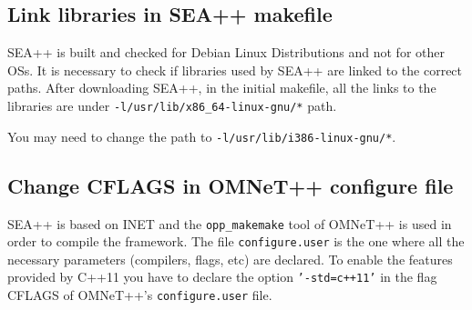 \subsection{Link libraries in SEA++ makefile}
SEA++ is built and checked for Debian Linux Distributions and not for other OSs. It is necessary to check if libraries used by SEA++ are linked to the correct paths. After downloading SEA++, in the initial makefile, all the links to the libraries are under \texttt{-l/usr/lib/x86\_64-linux-gnu/*} path.

You may need to change the path to \texttt{-l/usr/lib/i386-linux-gnu/*}.


\subsection{Change CFLAGS in OMNeT++ configure file}
SEA++ is based on INET and the \texttt{opp\_makemake} tool of OMNeT++ is used in order to compile the framework. The file \texttt{configure.user} is the one where all the necessary parameters (compilers, flags, etc) are declared. To enable the features provided by C++11 you have to declare the option \texttt{'-std=c++11'} in the flag CFLAGS of OMNeT++'s \texttt{configure.user} file.



